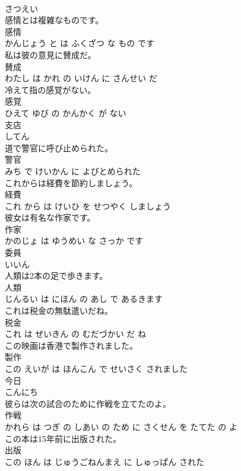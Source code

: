 \documentclass[8pt]{extreport}
\begin{document}
\begin{CJK}{UTF8}{min}
\\	さつえい		
\\	感情とは複雑なものです。	
\\	感情 
\\	かんじょう と は ふくざつ な もの です		
\\	私は彼の意見に賛成だ。	
\\	賛成 
\\	わたし は かれ の いけん に さんせい だ		
\\	冷えて指の感覚がない。	
\\	感覚 
\\	ひえて ゆび の かんかく が ない		
\\	支店	
\\	してん		
\\	道で警官に呼び止められた。	
\\	警官 
\\	みち で けいかん に よびとめられた		
\\	これからは経費を節約しましょう。	
\\	経費 
\\	これ から は けいひ を せつやく しましょう		
\\	彼女は有名な作家です。	
\\	作家 
\\	かのじょ は ゆうめい な さっか です		
\\	委員	
\\	いいん		
\\	人類は2本の足で歩きます。	
\\	人類 
\\	じんるい は にほん の あし で あるきます		
\\	これは税金の無駄遣いだね。	
\\	税金 
\\	これ は ぜいきん の むだづかい だ ね		
\\	この映画は香港で製作されました。	
\\	製作 
\\	この えいが は ほんこん で せいさく されました		
\\	今日	
\\	こんにち		
\\	彼らは次の試合のために作戦を立てたのよ。	
\\	作戦 
\\	かれら は つぎ の しあい の ため に さくせん を たてた の よ		
\\	この本は15年前に出版された。	
\\	出版 
\\	この ほん は じゅうごねんまえ に しゅっぱん された		

\end{CJK}
\end{document}
